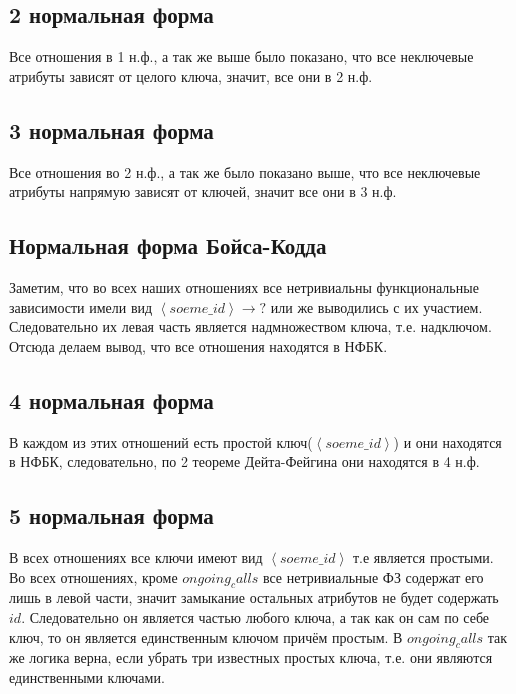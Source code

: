 \documentclass[fontsize=12pt]{article}
\begin{document}
\subsection*{2 нормальная форма}

Все отношения в 1 н.ф., а так же выше было показано, что все неключевые атрибуты зависят от целого ключа, значит, все они в 2 н.ф.

\subsection*{3 нормальная форма}

Все отношения во 2 н.ф., а так же было показано выше, что все неключевые атрибуты напрямую зависят от ключей, значит все они в 3 н.ф.

\subsection*{Нормальная форма Бойса-Кодда}

Заметим, что во всех наших отношениях все нетривиальны функциональные зависимости имели вид $\left< soeme\_id \right> \rightarrow ?$ или же выводились с их участием. Следовательно их левая часть является надмножеством ключа, т.е. надключом. Отсюда делаем вывод, что все отношения находятся в НФБК.

\subsection*{4 нормальная форма}

В каждом из этих отношений есть простой ключ($\left< soeme\_id \right>$) и они находятся в НФБК, следовательно, по 2 теореме Дейта-Фейгина они находятся в 4 н.ф.

\subsection*{5 нормальная форма}

В всех отношениях все ключи имеют вид $\left< soeme\_id \right>$ т.е является простыми. Во всех отношениях, кроме $ongoing_calls$ все нетривиальные ФЗ содержат его лишь в левой части, значит замыкание остальных атрибутов не будет содержать $id$. Следовательно он является частью любого ключа, а так как он сам по себе ключ, то он является единственным ключом причём простым. В $ongoing_calls$ так же логика верна, если убрать три известных простых ключа, т.е. они являются единственными ключами.
\end{document}
